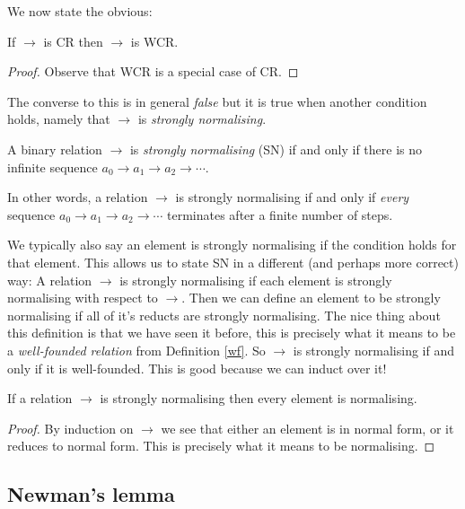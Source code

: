 We now state the obvious:

\begin{cor}\label{cr_is_wcr}
    If $\to$ is CR then $\to$ is WCR.
\end{cor}

\begin{proof}
    Observe that WCR is a special case of CR.
\end{proof}

The converse to this is in general \emph{false} but it is true when another condition holds, namely that $\to$ is \emph{strongly normalising}.

\begin{defin}
    A binary relation $\to$ is \emph{strongly normalising} (SN) if and only if there is no infinite sequence $a_0 \to a_1 \to a_2 \to  \cdots$.
\end{defin}

\begin{remark}
    In other words, a relation $\to$ is strongly normalising if and only if \emph{every} sequence $a_0 \to a_1 \to a_2 \to  \cdots$ terminates after a finite number of steps.
\end{remark}

\begin{remark}
    We typically also say an element is strongly normalising if the condition holds for that element. This allows us to state SN in a different (and perhaps more correct) way: A relation $\to$ is strongly normalising if each element is strongly normalising with respect to $\to$. Then we can define an element to be strongly normalising if all of it's reducts are strongly normalising. The nice thing about this definition is that we have seen it before, this is precisely what it means to be a \emph{well-founded relation} from Definition \ref{wf}. So $\to$ is strongly normalising if and only if it is well-founded. This is good because we can induct over it!
\end{remark}

\begin{cor}
    If a relation $\to$ is strongly normalising then every element is normalising.
\end{cor}

\begin{proof}
    By induction on $\to$ we see that either an element is in normal form, or it reduces to normal form. This is precisely what it means to be normalising.
\end{proof}

\subsection{Newman's lemma}

